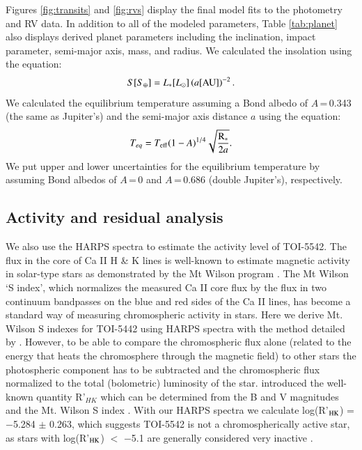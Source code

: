 \documentclass{aa}
\newcommand{\teff}{\ensuremath{T_{\rm eff}}\xspace}
\newcommand{\rstar}{\mbox{R$_{*}$}}
\begin{document}
Figures \ref{fig:transits} and \ref{fig:rvs} display the final model fits to the photometry and RV data. In addition to all of the modeled parameters, Table \ref{tab:planet} also displays derived planet parameters including the inclination, impact parameter, semi-major axis, mass, and radius. We calculated the insolation using the equation:
\begin{equation}
    S [S_{\oplus}] = L_{*} [L_{\odot}] \left(a [\rm{AU}] \right)^{-2}.
\end{equation}
We calculated the equilibrium temperature assuming a Bond albedo of $A$\,=\,0.343 (the same as Jupiter's) and the semi-major axis distance $a$ using the equation:
\begin{equation}
T_{eq} = \teff (1-A)^{1/4}\sqrt{\frac{\rstar}{2a}}.
\end{equation}
We put upper and lower uncertainties for the equilibrium temperature by assuming Bond albedos of $A$\,=\,0 and $A$\,=\,0.686 (double Jupiter's), respectively.

\subsection{Activity and residual analysis} \label{sec:activity}

We also use the HARPS spectra to estimate the activity level of TOI-5542. The flux in the core of Ca II H & K lines is well-known to estimate magnetic activity in solar-type stars as demonstrated by the Mt Wilson program \citep[e.g.,][]{Wilson1978,Duncan1991,Baliunas1995}. The Mt Wilson `S index', which normalizes the measured Ca II core flux by the flux in two continuum bandpasses on the blue and red sides of the Ca II lines, has become a standard way of measuring chromospheric activity in stars. Here we derive Mt. Wilson S indexes for TOI-5442 using HARPS spectra with the method detailed by \citet{Lovis2011}. However, to be able to compare the chromospheric flux alone (related to the energy that heats the chromosphere through the magnetic field) to other stars the photospheric component has to be subtracted and the chromospheric flux normalized to the total (bolometric) luminosity of the star. \citet{Noyes1984} introduced the well-known quantity R'$_{HK}$ which can be determined from the B and V magnitudes and the Mt. Wilson S index \citep[e.g.,][]{Middelkoop1982,Noyes1984}. With our HARPS spectra we calculate log(R'$_{\rm{HK}}$) = $-$5.284 $\pm$ 0.263, which suggests TOI-5542 is not a chromospherically active star, as stars with log(R'$_{\rm{HK}}$) $<$ $-$5.1 are generally considered very inactive \citep[e.g.,][]{Henry1996}.
\end{document}
